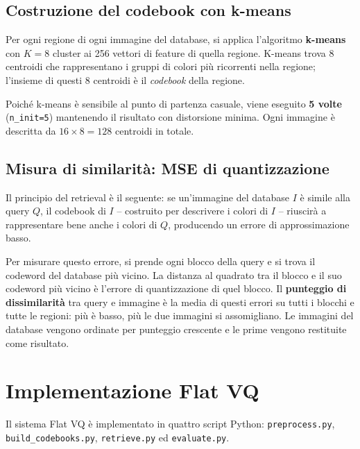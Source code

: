 \documentclass[12pt, a4paper]{article}
\begin{document}
\subsection{Costruzione del codebook con k-means}

Per ogni regione di ogni immagine del database, si applica l'algoritmo \textbf{k-means} con
$K=8$ cluster ai 256 vettori di feature di quella regione. K-means trova 8 centroidi che
rappresentano i gruppi di colori più ricorrenti nella regione; l'insieme di questi 8 centroidi
è il \textit{codebook} della regione.

Poiché k-means è sensibile al punto di partenza casuale, viene eseguito \textbf{5 volte}
(\texttt{n\_init=5}) mantenendo il risultato con distorsione minima. Ogni immagine è
descritta da $16 \times 8 = 128$ centroidi in totale.

\subsection{Misura di similarità: MSE di quantizzazione}

Il principio del retrieval è il seguente: se un'immagine del database $I$ è simile alla
query $Q$, il codebook di $I$ -- costruito per descrivere i colori di $I$ -- riuscirà a
rappresentare bene anche i colori di $Q$, producendo un errore di approssimazione basso.

Per misurare questo errore, si prende ogni blocco della query e si trova il codeword del
database più vicino. La distanza al quadrato tra il blocco e il suo codeword più vicino è
l'errore di quantizzazione di quel blocco. Il \textbf{punteggio di dissimilarità} tra query
e immagine è la media di questi errori su tutti i blocchi e tutte le regioni: più è basso,
più le due immagini si assomigliano. Le immagini del database vengono ordinate per punteggio
crescente e le prime vengono restituite come risultato.

\section{Implementazione Flat VQ}
\label{sec:impl_flatvq}

Il sistema Flat VQ è implementato in quattro script Python: \texttt{preprocess.py},
\texttt{build\_codebooks.py}, \texttt{retrieve.py} ed \texttt{evaluate.py}.
\end{document}
